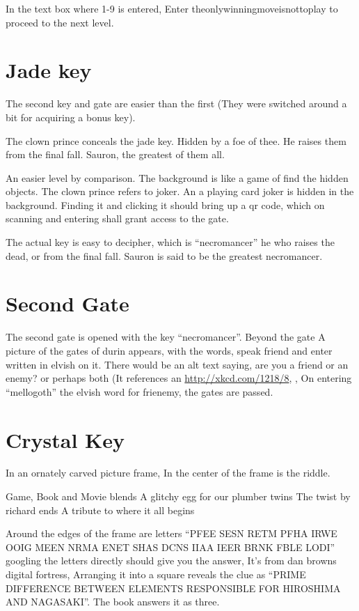 \documentclass[12pt]{article}
\begin{document}
In the text box where 1-9 is entered, Enter theonlywinningmoveisnottoplay to proceed to the next level.


\section{Jade key}

The second key and gate are easier than the first (They were switched around a bit for acquiring a bonus key).

\begin{centering}
The clown prince conceals the jade key.
Hidden by a foe of thee.
He raises them from the final fall.
Sauron, the greatest of them all.
\end{centering}

An easier level by comparison. The background is like a game of find the hidden objects. The clown prince refers to joker. An a playing card joker is hidden in the background. Finding it and clicking it should bring up a qr code, which on scanning and entering shall grant access to the gate. 

The actual key is easy to decipher, which is ``necromancer'' he who raises the dead, or from the final fall. Sauron is said to be the greatest necromancer.

\section{Second Gate}
The second gate is opened with the key ``necromancer''. Beyond the gate A picture of the gates of durin appears, with the words, speak friend and enter written in elvish on it. There would be an alt text saying, are you a friend or an enemy? or perhaps both (It references an \href{xkcd comic}{http://xkcd.com/1218/8}, , On entering ``mellogoth'' the elvish word for frienemy, the gates are passed.

\section{Crystal Key}
In an ornately carved picture frame, In the center of the frame is the riddle.
\begin{centering}
Game, Book and Movie blends
A glitchy egg for our plumber twins
The twist by richard ends
A tribute to where it all begins
\end{centering}
Around the edges of the frame are letters ``PFEE SESN RETM PFHA IRWE OOIG MEEN NRMA ENET SHAS DCNS IIAA IEER BRNK FBLE LODI'' googling the letters directly should give you the answer, It's from dan browns digital fortress, Arranging it into a square reveals the clue as ``PRIME DIFFERENCE BETWEEN ELEMENTS RESPONSIBLE FOR HIROSHIMA AND NAGASAKI''. The book answers it as three. 
\end{document}
